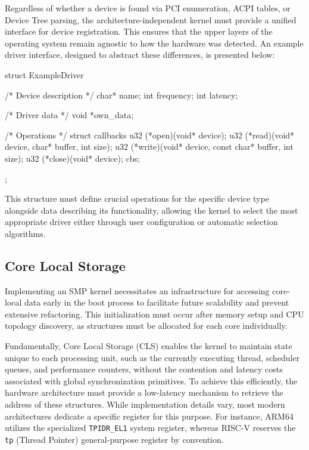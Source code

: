 \documentclass[a4paper,10pt,twoside]{report}
\theoremstyle{definition}
\begin{document}
Regardless of whether a device is found via PCI enumeration, ACPI tables, or Device Tree parsing, the architecture-independent kernel must provide a unified interface for device registration. This ensures that the upper layers of the operating system remain agnostic to how the hardware was detected. An example driver interface, designed to abstract these differences, is presented below:

\begin{cppcode}[caption={Example Driver Abstraction}, label={lst:drive_abstract}]
    struct ExampleDriver {
        /* Device description */
        char* name;
        int frequency;
        int latency;
        
        /* Driver data */
        void *own_data; 
    
        /* Operations */
        struct callbacks {
            u32 (*open)(void* device);
            u32 (*read)(void* device, char* buffer, int size);
            u32 (*write)(void* device, const char* buffer, int size);
            u32 (*close)(void* device);
        } cbs;
    };
\end{cppcode}

This structure must define crucial operations for the specific device type alongside data describing its functionality, allowing the kernel to select the most appropriate driver either through user configuration or automatic selection algorithms.

\subsection{Core Local Storage}

Implementing an SMP kernel necessitates an infrastructure for accessing core-local data early in the boot process to facilitate future scalability and prevent extensive refactoring. This initialization must occur after memory setup and CPU topology discovery, as structures must be allocated for each core individually. 

Fundamentally, Core Local Storage (CLS) enables the kernel to maintain state unique to each processing unit, such as the currently executing thread, scheduler queues, and performance counters, without the contention and latency costs associated with global synchronization primitives. To achieve this efficiently, the hardware architecture must provide a low-latency mechanism to retrieve the address of these structures. While implementation details vary, most modern architectures dedicate a specific register for this purpose. For instance, ARM64 utilizes the specialized \texttt{TPIDR\_EL1}\cite{AArch64-cls} system register, whereas RISC-V reserves the \texttt{tp}\cite{RISCV-registers} (Thread Pointer) general-purpose register by convention.
\end{document}
